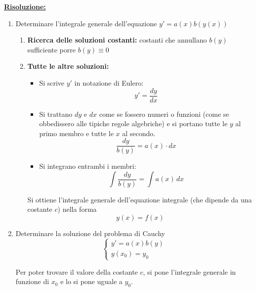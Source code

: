 \underline{\textbf{Risoluzione:}}
\begin{enumerate}
    \item Determinare l’integrale generale dell’equazione $y' = a(x)b(y(x))$
        \begin{enumerate}
            \item   \textbf{Ricerca delle soluzioni costanti:} costanti che annullano $b(y)$ \\
                    sufficiente porre $b(y) \equiv 0$
            \item   \textbf{Tutte le altre soluzioni:}
                    \begin{itemize}
                        \item   Si scrive $y'$ in notazione di Eulero:
                                \begin{equation}
                                    y' = \frac{dy}{dx}
                                \end{equation}
                        \item Si trattano $dy$ e $dx$ come se fossero numeri o funzioni (come se obbedissero alle tipiche regole algebriche) e si portano tutte le $y$ al primo membro e tutte le $x$ al secondo. \[ \frac{dy}{b(y)} = a(x) \cdot dx \]
                        \item   Si integrano entrambi i membri:
                                \begin{equation}
                                    \int \frac{dy}{b(y)} = \int a(x) \, dx 
                                \end{equation}
                    \end{itemize}
                    Si ottiene l'integrale generale dell'equazione integrale (che dipende da una costante $c$) nella forma
                    \[ y(x) = f(x) \]
        \end{enumerate}
    \item   Determinare la soluzione del problema di Cauchy
            \begin{equation}
                \begin{cases}
                    y' = a(x)b(y) \\
                    y(x_0) = y_0
                \end{cases}
            \end{equation}

            Per poter trovare il valore della costante $c$, si pone l'integrale generale in funzione di $x_0$ e lo si pone uguale a $y_0$.
\end{enumerate}

